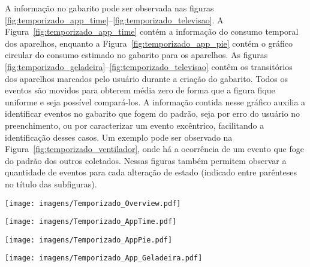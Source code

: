 A informação no gabarito pode ser observada nas figuras
\ref{fig:temporizado_app_time}--\ref{fig:temporizado_televisao}. 
A Figura~\ref{fig:temporizado_app_time} contém a informação do consumo
temporal dos aparelhos, enquanto a
Figura~\ref{fig:temporizado_app_pie} contém o gráfico circular do
consumo estimado no gabarito para os aparelhos. As figuras
\ref{fig:temporizado_geladeira}--\ref{fig:temporizado_televisao}
contêm os transitórios dos aparelhos marcados pelo usuário durante a
criação do gabarito. Todos os eventos são movidos para obterem média
zero de forma que a figura fique uniforme e seja possível compará-los.
A informação contida nesse gráfico auxilia a identificar eventos no
gabarito que fogem do padrão, seja por erro do usuário no
preenchimento, ou por caracterizar um evento excêntrico, facilitando a
identificação desses casos. Um exemplo pode ser observado na
Figura~\ref{fig:temporizado_ventilador}, onde há a ocorrência de um
evento que foge do padrão dos outros coletados. Nessas figuras também
permitem observar a quantidade de eventos para cada alteração de
estado (indicado entre parênteses no título das subfiguras).

\begin{sidewaysfigure}[p]
\centering
\texttt{[image: imagens/Temporizado\_Overview.pdf]}
\caption{Perfil de consumo para o conjunto de dados \emph{Temporizado}.}
\label{fig:temporizado_overview}
\end{sidewaysfigure}

\begin{sidewaysfigure}[p]
\centering
\texttt{[image: imagens/Temporizado\_AppTime.pdf]}
\caption{Informação no gabarito para o conjunto de dados
\emph{Temporizado}: consumo temporal dos aparelhos.}
\label{fig:temporizado_app_time}
\end{sidewaysfigure}

\begin{sidewaysfigure}[p]
\centering
\texttt{[image: imagens/Temporizado\_AppPie.pdf]}
\caption{Informação no gabarito para o conjunto de dados
\emph{Temporizado}: gráfico circular do consumo dos aparelhos.}
\label{fig:temporizado_app_pie}
\end{sidewaysfigure}

\begin{sidewaysfigure}[p]
\centering
\texttt{[image: imagens/Temporizado\_App\_Geladeira.pdf]}
\caption{Informação no gabarito para o conjunto de dados
\emph{Temporizado}: envoltória para as diversas variáveis para a
geladeira.}
\label{fig:temporizado_geladeira}
\end{sidewaysfigure}

